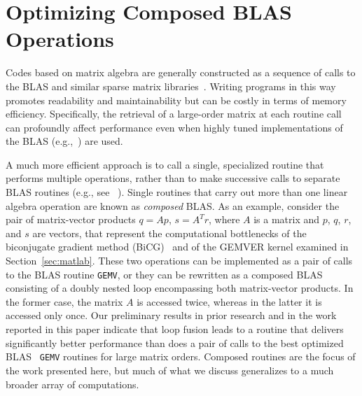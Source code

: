 \documentclass[runningheads]{llncs}
\begin{document}
\section{Optimizing Composed BLAS Operations}
\label{sec:approach}

Codes based on matrix algebra are generally constructed as a sequence of
calls to the BLAS
and similar
sparse matrix libraries~\cite{Saad:fr}.
Writing programs in
this way promotes readability and maintainability but can be costly in terms
of memory efficiency. Specifically, the retrieval of a large-order matrix at
each routine call can profoundly affect performance even when highly
tuned implementations of the BLAS (e.g.,~\cite{Goto:2006fk})
are used.

A much more efficient approach is to call a single, specialized routine that
performs multiple operations, rather than to make successive calls to separate BLAS
routines (e.g., see ~\cite{gropp01}).
Single routines that carry out more than one linear algebra operation are
known as \emph{composed} BLAS. As an example, consider the pair of
matrix-vector products $q = Ap$, $s = A^Tr$, where $A$ is a matrix and $p$,
$q$, $r$, and $s$ are vectors, that represent the computational bottlenecks
of the biconjugate gradient method (BiCG)~\cite{Saad:2003fk} and of the
GEMVER kernel examined in Section~\ref{sec:matlab}.  These two operations can
be implemented as a pair of calls to the BLAS routine {\tt GEMV}, or they can
be rewritten as a composed BLAS consisting of a doubly nested loop
encompassing both matrix-vector products. In the former case, the matrix $A$
is accessed twice, whereas in the latter it is accessed only once. Our
preliminary results in prior research and in the work reported in this paper
indicate that loop fusion leads to a routine that delivers significantly
better performance than does a pair of calls to the best optimized BLAS {\tt
GEMV} routines for large matrix orders.  Composed routines are the focus of
the work presented here, but much of what we discuss generalizes to a much
broader array of computations.
\end{document}
